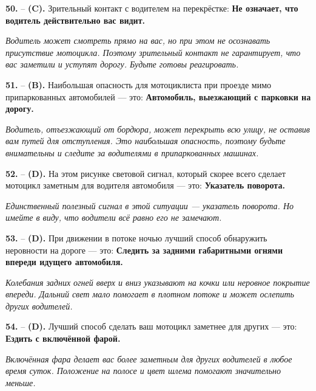 \begin{minipage}{\linewidth}
\noindent\textbf{50.}  -- \textbf {(C).} Зрительный контакт с водителем на перекрёстке:  \textbf {Не означает, что водитель действительно вас видит.} \par \textit {Водитель может смотреть прямо на вас, но при этом не осознавать присутствие мотоцикла. Поэтому зрительный контакт не гарантирует, что вас заметили и уступят дорогу. Будьте готовы реагировать.} \\
\end{minipage}

\begin{minipage}{\linewidth}
\noindent\textbf{51.}  -- \textbf {(B).} Наибольшая опасность для мотоциклиста при проезде мимо припаркованных автомобилей — это:  \textbf {Автомобиль, выезжающий с парковки на дорогу.} \par \textit {Водитель, отъезжающий от бордюра, может перекрыть всю улицу, не оставив вам путей для отступления. Это наибольшая опасность, поэтому будьте внимательны и следите за водителями в припаркованных машинах.} \\
\end{minipage}

\begin{minipage}{\linewidth}
\noindent\textbf{52.}  -- \textbf {(D).} На этом рисунке световой сигнал, который скорее всего сделает мотоцикл заметным для водителя автомобиля — это:  \textbf {Указатель поворота.} \par \textit {Единственный полезный сигнал в этой ситуации — указатель поворота. Но имейте в виду, что водители всё равно его не замечают.} \\
\end{minipage}

\begin{minipage}{\linewidth}
\noindent\textbf{53.}  -- \textbf {(D).} При движении в потоке ночью лучший способ обнаружить неровности на дороге — это:  \textbf {Следить за задними габаритными огнями впереди идущего автомобиля.} \par \textit {Колебания задних огней вверх и вниз указывают на кочки или неровное покрытие впереди. Дальний свет мало помогает в плотном потоке и может ослепить других водителей.} \\
\end{minipage}

\begin{minipage}{\linewidth}
\noindent\textbf{54.}  -- \textbf {(D).} Лучший способ сделать ваш мотоцикл заметнее для других — это:  \textbf {Ездить с включённой фарой.} \par \textit {Включённая фара делает вас более заметным для других водителей в любое время суток. Положение на полосе и цвет шлема помогают значительно меньше.} \\
\end{minipage}

